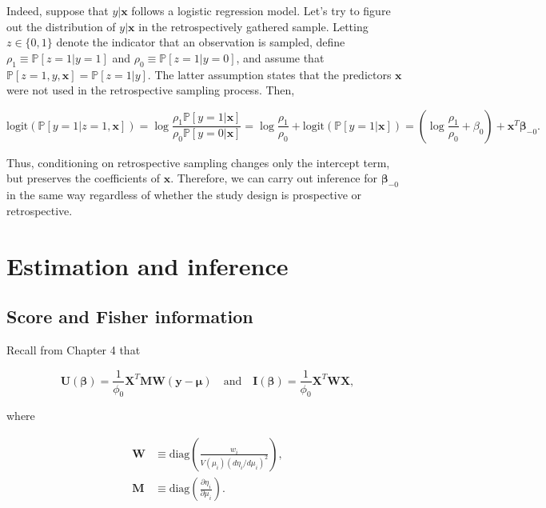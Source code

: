 \documentclass[
  11pt,
  letterpaper,
  oneside]{book}
\theoremstyle{plain}
\theoremstyle{plain}
\theoremstyle{definition}
\theoremstyle{definition}
\theoremstyle{plain}
\theoremstyle{remark}
\begin{document}
Indeed, suppose that \(y|\boldsymbol{x}\) follows a logistic regression
model. Let's try to figure out the distribution of \(y|\boldsymbol{x}\)
in the retrospectively gathered sample. Letting \(z \in \{0,1\}\) denote
the indicator that an observation is sampled, define
\(\rho_1 \equiv \mathbb{P}[z = 1|y = 1]\) and
\(\rho_0 \equiv \mathbb{P}[z = 1|y = 0]\), and assume that
\(\mathbb{P}[z = 1, y, \boldsymbol{x}] = \mathbb{P}[z = 1 | y]\). The
latter assumption states that the predictors \(\boldsymbol{x}\) were not
used in the retrospective sampling process. Then,

\[
\text{logit}(\mathbb{P}[y = 1|z = 1, \boldsymbol{x}]) = \log \frac{\rho_1 \mathbb{P}[y = 1|\boldsymbol{x}]}{\rho_0 \mathbb{P}[y = 0|\boldsymbol{x}]} = \log \frac{\rho_1}{\rho_0} + \text{logit}(\mathbb{P}[y = 1|\boldsymbol{x}]) = \left(\log \frac{\rho_1}{\rho_0} + \beta_0\right) + \boldsymbol{x}^T \boldsymbol{\beta}_{-0}.
\]

Thus, conditioning on retrospective sampling changes only the intercept
term, but preserves the coefficients of \(\boldsymbol{x}\). Therefore,
we can carry out inference for \(\boldsymbol{\beta}_{-0}\) in the same
way regardless of whether the study design is prospective or
retrospective.

\hypertarget{sec-estimation-inference}{%
\section{Estimation and inference}\label{sec-estimation-inference}}

\hypertarget{sec-score-fisher}{%
\subsection{Score and Fisher information}\label{sec-score-fisher}}

Recall from Chapter 4 that

\[
\boldsymbol{U}(\boldsymbol{\beta}) = \frac{1}{\phi_0}\boldsymbol{X}^T \boldsymbol{M} \boldsymbol{W} (\boldsymbol{y} - \boldsymbol{\mu}) \quad \text{and} \quad \boldsymbol{I}(\boldsymbol{\beta}) = \frac{1}{\phi_0}\boldsymbol{X}^T \boldsymbol{W} \boldsymbol{X},
\]

where

\[
\begin{aligned}
\boldsymbol{W} &\equiv \text{diag}\left(\frac{w_i}{V(\mu_i)(d\eta_i/d\mu_i)^2}\right), \\
\boldsymbol{M} &\equiv \text{diag}\left(\frac{\partial\eta_i}{\partial \mu_i}\right).
\end{aligned}
\]
\end{document}
